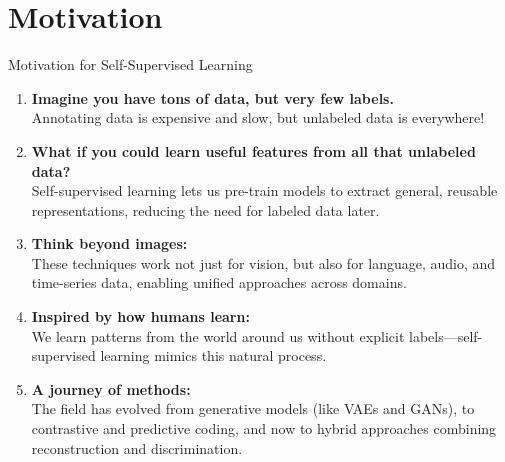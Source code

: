 \section{Motivation}

\begin{frame}{Motivation for Self-Supervised Learning}
    \begin{enumerate}
        \setlength{\itemsep}{-0.5em}
        \item \textbf{Imagine you have tons of data, but very few labels.}\\
        Annotating data is expensive and slow, but unlabeled data is everywhere!\\[0.5em]
        \item<2-> \textbf{What if you could learn useful features from all that unlabeled data?}\\
        Self-supervised learning lets us pre-train models to extract general, reusable representations, reducing the need for labeled data later.\\[0.5em]
        \item<3-> \textbf{Think beyond images:}\\
        These techniques work not just for vision, but also for language, audio, and time-series data, enabling unified approaches across domains.\\[0.5em]
        \item<4-> \textbf{Inspired by how humans learn:}\\
        We learn patterns from the world around us without explicit labels—self-supervised learning mimics this natural process.\\[0.5em]
        \item<5-> \textbf{A journey of methods:}\\
        The field has evolved from generative models (like VAEs and GANs), to contrastive and predictive coding, and now to hybrid approaches combining reconstruction and discrimination.
    \end{enumerate}

\end{frame}
